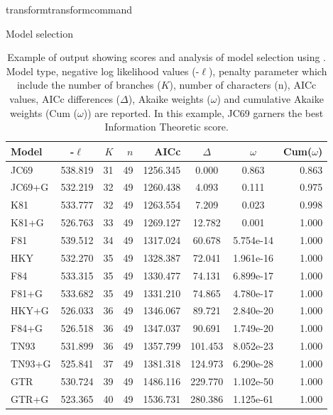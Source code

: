 \begin{command}{transform}{transformcommand}
\begin{arguments}
\begin {argumentgroup}{Model selection}
            \begin{table}[t]
                \small
                \caption{Example of \poy output showing scores and analysis of model 
                selection using .  Model type, negative log likelihood 
                values (-$\ell$),  penalty parameter which include the number of branches
                 ($K$), number of characters (n), AICc values, AICc differences (${\Delta}$), 
                Akaike weights (${\omega}$) and cumulative Akaike weights (Cum (${\omega}$)) are reported.
                In this example, JC69 garners the best Information Theoretic score. }
                \label {ModelSelectionReport}
                \begin{center}
                    \begin{tabular}{ l c r r  r  c c  r }
                        \hline
                        Model &-$\ell$ & $K$ & $n$ & AICc   & ${\Delta}$ &${\omega}$ & Cum(${\omega}$)\\
                        \hline
                        JC69  &538.819&31&49&1256.345&  0.000&0.863    &0.863 \\
                        JC69+G&532.219&32&49&1260.438&  4.093&0.111    &0.975 \\
                        K81   &533.777&32&49&1263.554&  7.209&0.023    &0.998 \\
                        K81+G &526.763&33&49&1269.127& 12.782&0.001    &1.000 \\
                        F81   &539.512&34&49&1317.024& 60.678&5.754e-14&1.000 \\
                        HKY   &532.270&35&49&1328.387& 72.041&1.961e-16&1.000 \\
                        F84   &533.315&35&49&1330.477& 74.131&6.899e-17&1.000 \\
                        F81+G &533.682&35&49&1331.210& 74.865&4.780e-17&1.000 \\
                        HKY+G &526.033&36&49&1346.067& 89.721&2.840e-20&1.000 \\
                        F84+G &526.518&36&49&1347.037& 90.691&1.749e-20&1.000 \\
                        TN93  &531.899&36&49&1357.799&101.453&8.052e-23&1.000 \\
                        TN93+G&525.841&37&49&1381.318&124.973&6.290e-28&1.000 \\
                        GTR   &530.724&39&49&1486.116&229.770&1.102e-50&1.000 \\
                        GTR+G &523.365&40&49&1536.731&280.386&1.125e-61&1.000 \\
                        \hline
                    \end{tabular}
                \end{center}
            \end{table}


\end{argumentgroup}
\end{arguments}
\end{command}
